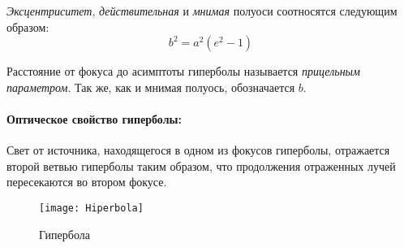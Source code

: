 \textit{Эксцентриситет}, \textit{действительная} и \textit{мнимая} полуоси соотносятся следующим образом:
\begin{equation}
b^2=a^2(e^2-1)
\end{equation}

Расстояние от фокуса до асимптоты гиперболы называется \textit{прицельным параметром}. Так же, как и мнимая полуось, обозначается $b$.
\paragraph{Оптическое свойство гиперболы:}

Свет от источника, находящегося в одном из фокусов гиперболы, отражается второй ветвью гиперболы таким образом, что продолжения отраженных лучей пересекаются во втором фокусе.
\begin{figure}[h!]
\centering
\texttt{[image: Hiperbola]}
\caption{Гипербола \label{pic:the-pic}}
\end{figure}